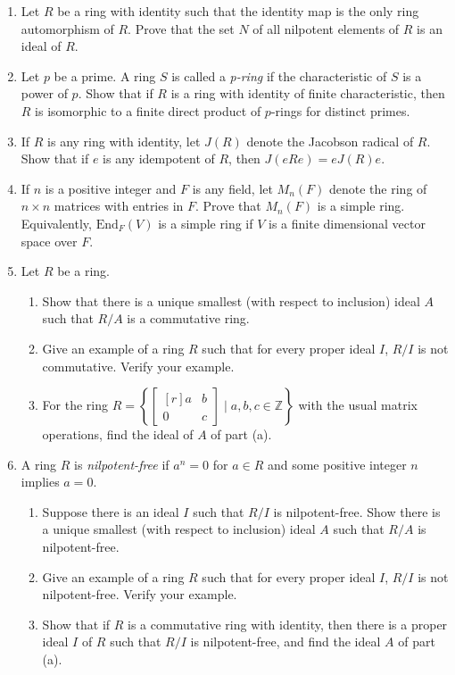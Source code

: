 \documentclass{article}
\theoremstyle{definition}
\newcommand{\Z}{\mathbb{Z}}
\newcommand{\mat}[1]{\begin{bmatrix*}[r] #1 \end{bmatrix*}}
\newcommand{\x}{\times}
\newcommand{\set}[1]{\left\{#1\right\}}
\begin{document}
\begin{enumerate}
            \item Let $R$ be a ring with identity such that the identity map is the only ring automorphism of $R$. Prove that the set $N$ of all nilpotent elements of $R$ is an ideal of $R$.
            
            \item Let $p$ be a prime. A ring $S$ is called a \textit{p-ring} if the characteristic of $S$ is a power of $p$. Show that if $R$ is a ring with identity of finite characteristic, then $R$ is isomorphic to a finite direct product of $p$-rings for distinct primes.
            
            \item If $R$ is any ring with identity, let $J(R)$ denote the Jacobson radical of $R$. Show that if $e$ is any idempotent of $R$, then $J(eRe)=eJ(R)e$.
            
            \item If $n$ is a positive integer and $F$ is any field, let $M_n(F)$ denote the ring of $n\x n$ matrices with entries in $F$. Prove that $M_n(F)$ is a simple ring. Equivalently, $\text{End}_F(V)$ is a simple ring if $V$ is a finite dimensional vector space over $F$.
            
            \item Let $R$ be a ring.
            
            \begin{enumerate}
                \item Show that there is a unique smallest (with respect to inclusion) ideal $A$ such that $R/A$ is a commutative ring.
                \item Give an example of a ring $R$ such that for every proper ideal $I$, $R/I$ is not commutative. Verify your example.
                \item For the ring $R=\set{\mat{a&b\\0&c} \mid a,b,c\in \Z}$ with the usual matrix operations, find the ideal of $A$ of part (a).
            \end{enumerate}

            \item A ring $R$ is \textit{nilpotent-free} if $a^n=0$ for $a\in R$ and some positive integer $n$ implies $a=0$.
            
            \begin{enumerate}
                \item Suppose there is an ideal $I$ such that $R/I$ is nilpotent-free. Show there is a unique smallest (with respect to inclusion) ideal $A$ such that $R/A$ is nilpotent-free.
                \item Give an example of a ring $R$ such that for every proper ideal $I$, $R/I$ is not nilpotent-free. Verify your example.
                \item Show that if $R$ is a commutative ring with identity, then there is a proper ideal $I$ of $R$ such that $R/I$ is nilpotent-free, and find the ideal $A$ of part (a).
            \end{enumerate}
            

\end{enumerate}
\end{document}
